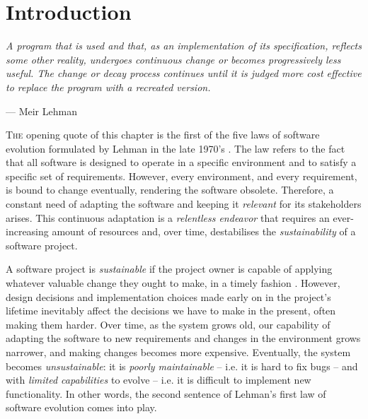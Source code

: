 \chapter{Introduction}\label{chap:introduction}

\epigraph{\emph{A program that is used and that, as an implementation of its specification, reflects some other reality, undergoes continuous change or becomes progressively less useful.
The change or decay process continues until it is judged more cost effective to replace the program with a recreated version.}}{--- Meir Lehman}

\lettrine{T}{he} opening quote of this chapter is the first of the five laws of software evolution formulated by Lehman in the late 1970's \cite{Lehman1979}.
The law refers to the fact that all software is designed to operate in a specific environment and to satisfy a specific set of requirements. 
However, every environment, and every requirement, is bound to change eventually, rendering the software obsolete. %
Therefore, a constant need of adapting the software and keeping it \emph{relevant} for its stakeholders arises.
This continuous adaptation is a \emph{relentless endeavor} that requires an ever-increasing amount of resources and, over time, destabilises the \emph{sustainability} of a software project.

A software project is \emph{sustainable} if the project owner is capable of applying whatever valuable change they ought to make, in a timely fashion \cite{Winters2020}.
However, design decisions and implementation choices made early on in the project's lifetime inevitably affect the decisions we have to make in the present, often making them harder.
Over time, as the system grows old, our capability of adapting the software to new requirements and changes in the environment grows narrower, and making changes becomes more expensive.
Eventually, the system becomes \emph{unsustainable}: it is \emph{poorly maintainable} -- i.e. it is hard to fix bugs -- and with \emph{limited capabilities} to evolve -- i.e. it is difficult to implement new functionality. In other words, the second sentence of Lehman's first law of software evolution comes into play.

